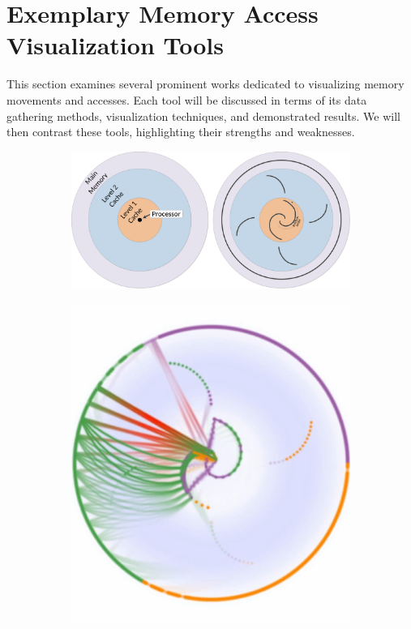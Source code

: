 \section{Exemplary Memory Access Visualization Tools}\label{sec:works}

This section examines several prominent works dedicated to visualizing memory movements and accesses. Each tool will be discussed in terms of its data gathering methods, visualization techniques, and demonstrated results. We will then contrast these tools, highlighting their strengths and weaknesses.

\begin{figure}
	\begin{subfigure}[c]{.48\linewidth}
		\centering
		\includegraphics[width=\linewidth]{pictures/abstract_explanation.png}
	\end{subfigure}
	\begin{subfigure}[c]{.24\linewidth}
		\centering
		\includegraphics[width=\linewidth]{pictures/abstract_standard.png}

\end{subfigure}
\end{figure}

